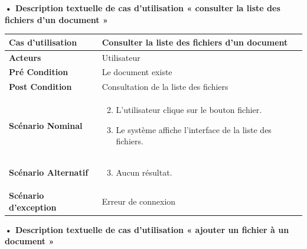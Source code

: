 \textbf{•	Description textuelle de cas d'utilisation « consulter la liste des fichiers d'un document »}

\begin{longtable}{|p{5cm}|p{10cm}|}
\hline
\textbf{Cas d'utilisation}&Consulter la liste des fichiers d'un document\\
\hline
\textbf{Acteurs}&Utilisateur\\
\hline
\textbf{Pré Condition}&Le document existe\\
\hline
\textbf{Post Condition}&Consultation de la liste des fichiers\\
\hline
\textbf{Scénario Nominal}&
\vspace{-\baselineskip}
\begin{enumerate}
    \setcounter{enumi}{1}
    \item L'utilisateur clique sur le bouton fichier.
    \item Le système affiche l'interface de la liste des fichiers.
    
\end{enumerate}\\
\hline
\textbf{Scénario Alternatif}&
\vspace{-\baselineskip}
\begin{enumerate}
    \setcounter{enumi}{2}
    \item Aucun résultat.
\end{enumerate}\\
\hline
\textbf{Scénario d'exception}&Erreur de connexion\\
\hline
\end{longtable}

\textbf{•	Description textuelle de cas d'utilisation « ajouter un fichier à un document »}

